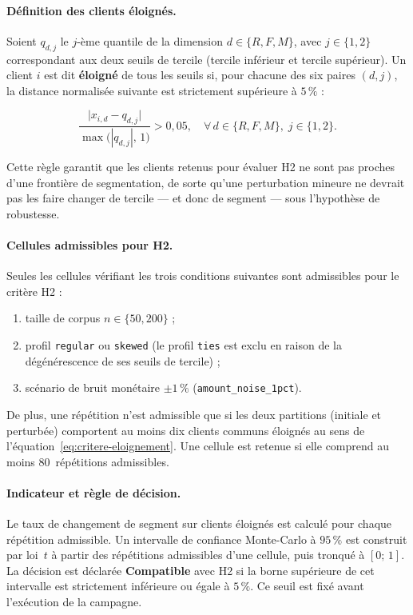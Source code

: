 \paragraph{Définition des clients éloignés.}
Soient $q_{d,j}$ le $j$-ème quantile de la dimension $d \in \{R, F, M\}$, avec $j \in
\{1, 2\}$ correspondant aux deux seuils de tercile (tercile inférieur et tercile
supérieur). Un client $i$ est dit \textbf{éloigné} de tous les seuils si, pour chacune
des six paires $(d, j)$, la distance normalisée suivante est strictement supérieure à
$5\,\%$ :

\begin{equation}
  \frac{\bigl|x_{i,d} - q_{d,j}\bigr|}{\max\!\bigl(|q_{d,j}|,\, 1\bigr)} > 0{,}05,
  \quad \forall\, d \in \{R, F, M\},\; j \in \{1, 2\}.
  \label{eq:critere-eloignement}
\end{equation}

Cette règle garantit que les clients retenus pour évaluer H2 ne sont pas proches d'une
frontière de segmentation, de sorte qu'une perturbation mineure ne devrait pas les faire
changer de tercile — et donc de segment — sous l'hypothèse de robustesse.

\paragraph{Cellules admissibles pour H2.}
Seules les cellules vérifiant les trois conditions suivantes sont admissibles pour le
critère H2 :

\begin{enumerate}
  \item taille de corpus $n \in \{50, 200\}$ ;
  \item profil \texttt{regular} ou \texttt{skewed} (le profil \texttt{ties} est exclu en
    raison de la dégénérescence de ses seuils de tercile) ;
  \item scénario de bruit monétaire $\pm1\,\%$ (\texttt{amount\_noise\_1pct}).
\end{enumerate}

De plus, une répétition n'est admissible que si les deux partitions (initiale et perturbée)
comportent au moins dix clients communs éloignés au sens de l'équation~\eqref{eq:critere-eloignement}. Une cellule est retenue si elle comprend au moins 80~répétitions
admissibles.

\paragraph{Indicateur et règle de décision.}
Le taux de changement de segment sur clients éloignés est calculé pour chaque répétition
admissible. Un intervalle de confiance Monte-Carlo à $95\,\%$ est construit par loi~$t$
à partir des répétitions admissibles d'une cellule, puis tronqué à $[0;\, 1]$. La
décision est déclarée \textbf{Compatible} avec H2 si la borne supérieure de cet intervalle
est strictement inférieure ou égale à $5\,\%$. Ce seuil est fixé avant l'exécution de la
campagne.

